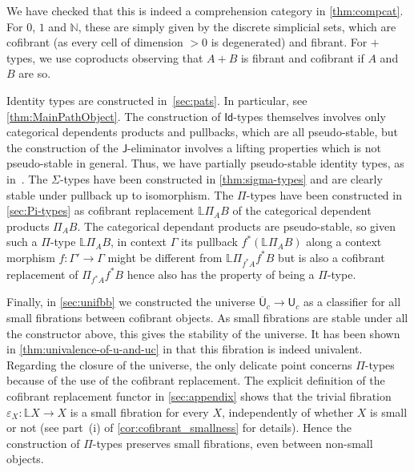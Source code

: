 \documentclass[reqno,10pt,a4paper,oneside,draft]{amsart}
\makeatletter
\renewenvironment{proof}[1][\proofname] {\par\pushQED{\qed}\normalfont\topsep6\p@\@plus6\p@\relax\trivlist\item[\hskip\labelsep\bf#1\@addpunct{.}]\ignorespaces}{\popQED\endtrivlist\@endpefalse}
\numberwithin{equation}{section}
\theoremstyle{mythm}
\theoremstyle{mydef}
\theoremstyle{myrmk}
\newcommand{\co}{\colon}
\newcommand{\UU}{\overline{\mathsf{U}}}
\newcommand{\U}{\mathsf{U}}
\newcommand{\Id}{\mathsf{Id}}
\makeatother
\begin{document}
\begin{proof}
We have checked that this is indeed a comprehension category in \cref{thm:compcat}. 
For $0$, $1$ and $\mathbb{N}$, these are simply given by the discrete simplicial sets, which are cofibrant (as every cell of dimension $>0$ is degenerated) and fibrant. For $+$ types, we use coproducts observing that
 $A + B$ is fibrant and cofibrant if $A$ and $B$ are so. 
 
Identity types are constructed in~\cref{sec:pats}. In particular, see \cref{thm:MainPathObject}. The construction of $\Id$-types themselves involves only categorical dependents products and pullbacks, which are all pseudo-stable, but the construction of the $\mathsf{J}$-eliminator involves a lifting properties which is not pseudo-stable 
in general. Thus, we have partially pseudo-stable identity types, as in~\cite[Definition 2.3.4]{LumsdaineP:locuoc}. The $\Sigma$-types have been constructed in \cref{thm:sigma-types} and are clearly stable under pullback up to isomorphism.  
The $\Pi$-types have been constructed in \cref{sec:Pi-types} as cofibrant replacement $\mathbb{L} \Pi_A B$ of the categorical dependent products $\Pi_A B$. The categorical dependant products are pseudo-stable, so given such a $\Pi$-type $\mathbb{L} \Pi_A B$, in context $\Gamma$ its pullback $f^*( \mathbb{L} \Pi_A B)$ along a context morphism $f \co \Gamma' \rightarrow \Gamma$ might be different from $\mathbb{L} \Pi_{f^* A} f^* B$ but is also a cofibrant replacement of $\Pi_{f^* A} f^* B$ hence also has the property of being a $\Pi$-type.

Finally, in \cref{sec:unifbb} we constructed the universe $\UU_c \rightarrow \U_c$ as a classifier for all small fibrations between cofibrant objects. As small fibrations are stable under all the constructor above, this gives the stability of the universe. It has been shown in \cref{thm:univalence-of-u-and-uc} in that this fibration is indeed univalent. Regarding the closure of the universe, the only delicate point concerns $\Pi$-types because of the
use of the cofibrant replacement.  The explicit definition of the cofibrant replacement functor 
in  \cref{sec:appendix} shows that  the trivial fibration $\varepsilon_X \co \mathbb{L} X \rightarrow X$ is a small fibration for every $X$, independently of whether $X$ is small or not (see part~(i) of \cref{cor:cofibrant_smallness} for details). Hence the construction of $\Pi$-types  preserves small fibrations, even between non-small objects.
\end{proof}
\end{document}
